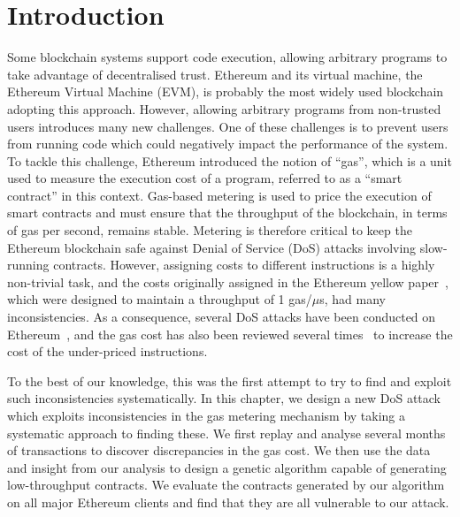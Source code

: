 \section{Introduction}
\label{sec:3:introduction}

Some blockchain systems support code execution, allowing arbitrary programs to take advantage of decentralised trust.
Ethereum and its virtual machine, the Ethereum Virtual Machine (EVM), is probably the most widely used blockchain adopting this approach.
However, allowing arbitrary programs from non-trusted users introduces many new challenges.
One of these challenges is to prevent users from running code which could negatively impact the performance of the system.
To tackle this challenge, Ethereum introduced the notion of ``gas'', which is a unit used to measure the execution cost of a program, referred to as a ``smart contract'' in this context.
Gas-based metering is used to price the execution of smart contracts and must ensure that the throughput of the blockchain, in terms of gas per second, remains stable.
Metering is therefore critical to keep the Ethereum blockchain safe against Denial of Service (DoS) attacks involving slow-running contracts.
However, assigning costs to different instructions is a highly non-trivial task, and the costs originally assigned in the Ethereum yellow paper~\cite{wood2014ethereum}, which were designed to maintain a throughput of 1 gas/$\mu$s, had many inconsistencies.
As a consequence, several DoS attacks have been conducted on Ethereum~\cite{transaction-spam-attack,suicide-attack}, and the gas cost has also been reviewed several times~\cite{erc150,eip-1884} to increase the cost of the under-priced instructions.

To the best of our knowledge, this was the first attempt to try to find and exploit such inconsistencies systematically.
In this chapter, we design a new DoS attack which exploits inconsistencies in the gas metering mechanism by taking a systematic approach to finding these.
We first replay and analyse several months of transactions to discover discrepancies in the gas cost.
We then use the data and insight from our analysis to design a genetic algorithm capable of generating low-throughput contracts.
We evaluate the contracts generated by our algorithm on all major Ethereum clients and find that they are all vulnerable to our attack.

